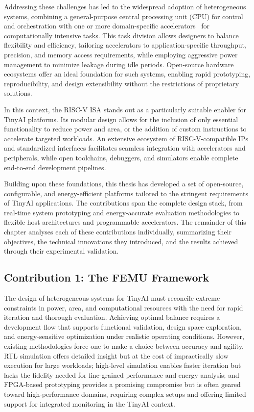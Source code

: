         Addressing these challenges has led to the widespread adoption of heterogeneous systems, combining a general-purpose central processing unit (CPU) for control and orchestration with one or more domain-specific accelerators~\cite{e-gpu, asip, oe-cgra, blade} for computationally intensive tasks. This task division allows designers to balance flexibility and efficiency, tailoring accelerators to application-specific throughput, precision, and memory access requirements, while employing aggressive power management to minimize leakage during idle periods. Open-source hardware ecosystems offer an ideal foundation for such systems, enabling rapid prototyping, reproducibility, and design extensibility without the restrictions of proprietary solutions.
        
        In this context, the RISC-V ISA stands out as a particularly suitable enabler for TinyAI platforms. Its modular design allows for the inclusion of only essential functionality to reduce power and area, or the addition of custom instructions to accelerate targeted workloads. An extensive ecosystem of RISC-V-compatible IPs and standardized interfaces facilitates seamless integration with accelerators and peripherals, while open toolchains, debuggers, and simulators enable complete end-to-end development pipelines.
        
        Building upon these foundations, this thesis has developed a set of open-source, configurable, and energy-efficient platforms tailored to the stringent requirements of TinyAI applications. The contributions span the complete design stack, from real-time system prototyping and energy-accurate evaluation methodologies to flexible host architectures and programmable accelerators. The remainder of this chapter analyses each of these contributions individually, summarizing their objectives, the technical innovations they introduced, and the results achieved through their experimental validation.
        
        \subsection*{Contribution 1: The FEMU Framework}
        
            The design of heterogeneous systems for TinyAI must reconcile extreme constraints in power, area, and computational resources with the need for rapid iteration and thorough evaluation. Achieving optimal balance requires a development flow that supports functional validation, design space exploration, and energy-sensitive optimization under realistic operating conditions. However, existing methodologies force one to make a choice between accuracy and agility. RTL simulation offers detailed insight but at the cost of impractically slow execution for large workloads; high-level simulation enables faster iteration but lacks the fidelity needed for fine-grained performance and energy analysis; and FPGA-based prototyping provides a promising compromise but is often geared toward high-performance domains, requiring complex setups and offering limited support for integrated monitoring in the TinyAI context.


